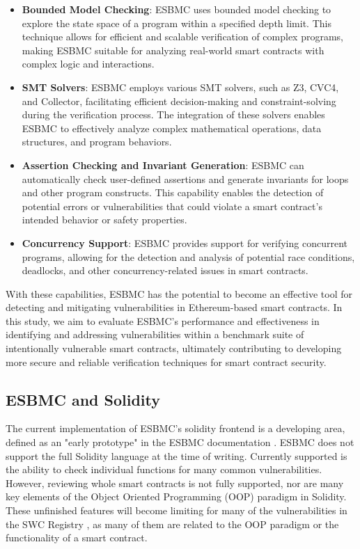 \begin{itemize}

\item \textbf{Bounded Model Checking}: ESBMC uses bounded model checking to explore the state space of a program within a specified depth limit. This technique allows for efficient and scalable verification of complex programs, making ESBMC suitable for analyzing real-world smart contracts with complex logic and interactions.

\item \textbf{SMT Solvers}: ESBMC employs various SMT solvers, such as Z3, CVC4, and Collector, facilitating efficient decision-making and constraint-solving during the verification process. The integration of these solvers enables ESBMC to effectively analyze complex mathematical operations, data structures, and program behaviors.

\item \textbf{Assertion Checking and Invariant Generation}: ESBMC can automatically check user-defined assertions and generate invariants for loops and other program constructs. This capability enables the detection of potential errors or vulnerabilities that could violate a smart contract's intended behavior or safety properties.

\item \textbf{Concurrency Support}: ESBMC provides support for verifying concurrent programs, allowing for the detection and analysis of potential race conditions, deadlocks, and other concurrency-related issues in smart contracts.

\end{itemize}

With these capabilities, ESBMC has the potential to become an effective tool for detecting and mitigating vulnerabilities in Ethereum-based smart contracts. In this study, we aim to evaluate ESBMC's performance and effectiveness in identifying and addressing vulnerabilities within a benchmark suite of intentionally vulnerable smart contracts, ultimately contributing to developing more secure and reliable verification techniques for smart contract security.

\subsection{ESBMC and Solidity}

The current implementation of ESBMC's solidity frontend is a developing area, defined as an "early prototype" in the ESBMC documentation \cite{esbmc_doc}. ESBMC does not support the full Solidity language at the time of writing. Currently supported is the ability to check individual functions for many common vulnerabilities. However, reviewing whole smart contracts is not fully supported, nor are many key elements of the Object Oriented Programming (OOP) paradigm in Solidity. These unfinished features will become limiting for many of the vulnerabilities in the SWC Registry \cite{swc}, as many of them are related to the OOP paradigm or the functionality of a smart contract.

